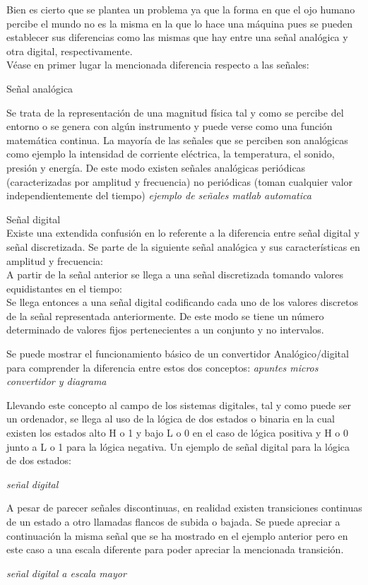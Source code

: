 Bien es cierto que se plantea un problema ya que la forma en que el ojo humano percibe el mundo no es la misma en la que lo hace una máquina pues se pueden establecer sus diferencias como las mismas que hay entre una señal analógica y otra digital, respectivamente.
\\
Véase en primer lugar la mencionada diferencia respecto a las señales:

\begin{list}{•}
\item Señal analógica

Se trata de la representación de una magnitud física tal y como se percibe del entorno o se genera con algún instrumento y puede verse como una función matemática continua.
La mayoría de las señales que se perciben son analógicas como ejemplo la intensidad de corriente eléctrica, la temperatura, el sonido, presión y energía.
De este modo existen señales analógicas periódicas (caracterizadas por amplitud y frecuencia) no periódicas (toman cualquier valor independientemente del tiempo)
\textit {ejemplo de señales matlab automatica}

\item Señal digital
\\
Existe una extendida confusión en lo referente a la diferencia entre señal digital y señal discretizada. Se parte de la siguiente señal analógica y sus características en amplitud y frecuencia:
\\
A partir de la señal anterior se llega a una señal discretizada tomando valores equidistantes en el tiempo:
\\
Se llega entonces a una señal digital codificando cada uno de los valores discretos de la señal representada anteriormente. De este modo se tiene un número determinado de valores fijos pertenecientes a un conjunto y no intervalos.

Se puede mostrar el funcionamiento básico de un convertidor Analógico/digital para comprender la diferencia entre estos dos conceptos:
\textit{apuntes micros convertidor y diagrama}

Llevando este concepto al campo de los sistemas digitales, tal y como puede ser un ordenador, se llega al uso de la lógica de dos estados o binaria en la cual existen los estados alto H o 1 y bajo L o 0 en el caso de lógica positiva y H o 0 junto a L o 1 para la lógica negativa.
Un ejemplo de señal digital para la lógica de dos estados:

\textit{señal digital}

A pesar de parecer señales discontinuas, en realidad existen transiciones continuas de un estado a otro llamadas flancos de subida o bajada. 
Se puede apreciar a continuación la misma señal que se ha mostrado en el ejemplo anterior pero en este caso a una escala diferente para poder apreciar la mencionada transición.

\textit{señal digital a escala mayor}
\end{list}

